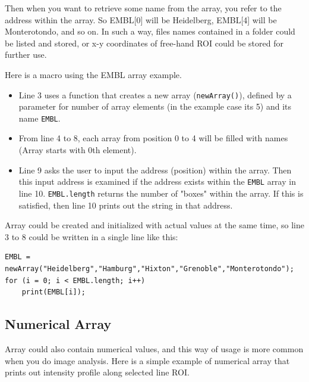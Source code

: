 \documentclass[11pt,a4paper,oneside]{report}
\newcommand{\ilcom}[1]{\texttt{\small#1}}
\begin{document}
Then when you want to retrieve some name from the array, you refer to the address within the array. 
So EMBL[0] will be Heidelberg, EMBL[4] will be Monterotondo, and so on. 
In such a way, files names contained in a folder could be listed and stored, 
or x-y coordinates of free-hand ROI could be stored for further use. 

Here is a macro using the EMBL array example. 



\begin{itemize}
\item Line 3 uses a function that creates a new array (\ilcom{newArray()}),
defined by a parameter for number of array elements (in the example case its 5) and its name \ilcom{EMBL}.
\item From line 4 to 8, each array from position 0 to 4 will be filled with
names (Array starts with 0th element).
\item Line 9 asks the user to input the address (position) within the array.
Then this input address is examined if the address exists within the
\ilcom{EMBL} array in line 10. \ilcom{EMBL.length} returns the number of "boxes"
within the array. If this is satisfied, then line 10 prints out the string in that address.
\end{itemize}

Array could be created and initialized with actual values at the
same time, so line 3 to 8 could be written in a single line like this: 
\begin{lstlisting}[numbers=none]
EMBL = newArray("Heidelberg","Hamburg","Hixton","Grenoble","Monterotondo");
for (i = 0; i < EMBL.length; i++)
    print(EMBL[i]);
\end{lstlisting}

\subsection{Numerical Array}

Array could also contain numerical values, and this way of usage is more common when you do image analysis. Here is a simple example of numerical array that prints out intensity profile along selected line ROI. 


\end{document}
